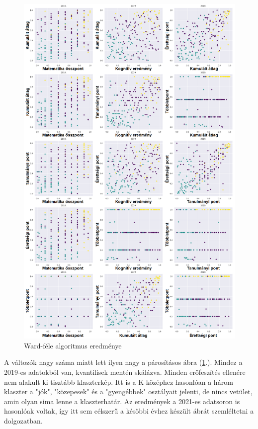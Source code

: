 \documentclass[12pt]{article}
\begin{document}
\begin{figure}[H]
\centering
\includegraphics[scale = 0.55]{kepek/klacterward.png}
\caption{Ward-féle algoritmus eredménye}
\label{fig:klacterward}
\end{figure}

A változók nagy száma miatt lett ilyen nagy a párosításos ábra (\ref{fig:klacterward}.). Mindez a 2019-es adatokból van, kvantilisek mentén skálázva. Minden erőfeszítés ellenére nem alakult ki tisztább klaszterkép. Itt is a K-középhez hasonlóan a három klaszter a "jók", "közepesek" és a "gyengébbek" osztályait jelenti, de nincs vetület, amin olyan sima lenne a klaszterhatár. Az eredmények a 2021-es adatsoron is hasonlóak voltak, így itt sem célszerű a későbbi évhez készült ábrát szemléltetni a dolgozatban.
\end{document}
